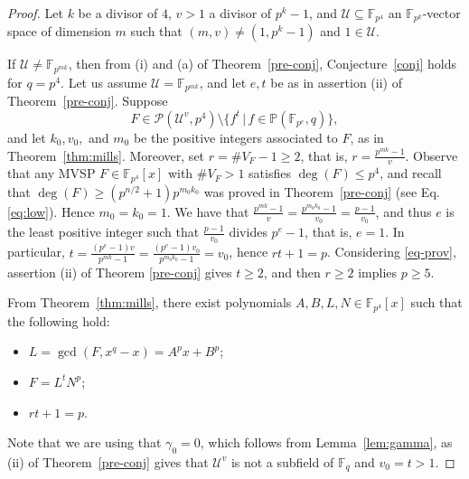 \documentclass[10pt,a4paper]{amsart}
\newcommand{\F}{\mathbb{F}}
\newcommand{\pp}{\mathbb P}
\begin{document}
\begin{proof}
Let $k$ be a divisor of $4$, $v>1$  a divisor of $p^k-1$, and  $\mathcal U\subseteq \F_{p^4}$  an $\F_{p^k}$-vector space of dimension $m$ such that $(m, v)\ne (1, p^k-1)$ and $1\in\mathcal U$. 


If $\mathcal U\neq \F_{p^{mk}}$, then from  (i) and (a) of Theorem~\ref{pre-conj},  Conjecture~\ref{conj} holds for $q=p^4$.  Let us assume  $\mathcal U=\F_{p^{mk}}$, and let $e, t$ be as in assertion (ii) of Theorem~\ref{pre-conj}. Suppose 
\begin{equation}\label{eq-prov}
F\in \mathcal P(\mathcal U^v, p^4)\setminus \{ f^{t}\,|\, f\in \pp(\F_{p^e}, q)\},
\end{equation}
 and let $k_0, v_0,$ and  $m_0$ be the positive integers associated to $F$, as in Theorem~\ref{thm:mills}. Moreover, set $r=\# V_F-1\ge 2$, that is, $r=\frac{p^{mk}-1}{v}$. Observe that any MVSP $F\in \F_{p^4}[x]$ with $\#V_F>1$ satisfies $\deg(F)\le p^4$, and 
recall that $\deg(F)\ge (p^{n/2}+1)p^{m_0k_0}$ was proved in Theorem~\ref{pre-conj} (see Eq. \eqref{eq:low}). Hence $m_0=k_0=1$. We have that $\frac{p^{mk}-1}{v}=\frac{p^{m_0k_0}-1}{v_0}=\frac{p-1}{v_0}$,  and thus $e$ is the least positive integer such that $\frac{p-1}{v_0} $ divides $p^e-1$, that is, $e=1$. In particular, $t=\frac{(p^e-1)v}{p^{mk}-1}=\frac{(p^e-1)v_0}{p^{m_0k_0}-1}=v_0$,  hence $rt+1=p$. Considering \eqref{eq-prov}, assertion (ii) of  Theorem \ref{pre-conj} gives $t\ge 2$, and then  $ r\ge 2$  implies $p\ge 5$. 

From Theorem~\ref{thm:mills}, there exist polynomials $A, B, L, N\in \F_{p^4}[x]$ such that the following hold:
\begin{itemize}%
\item $L=\gcd(F,x^q-x)=A^px+B^p$;
\item $F=L^tN^p$;
\item  $rt+1=p$.
\end{itemize}
Note that  we are using that $\gamma_0=0$, which  follows from Lemma~\ref{lem:gamma}, as  (ii) of Theorem~\ref{pre-conj} gives that $\mathcal{U}^v$  is not a subfield of $\mathbb{F}_q$ and  $v_0=t>1$.


\end{proof}
\end{document}
